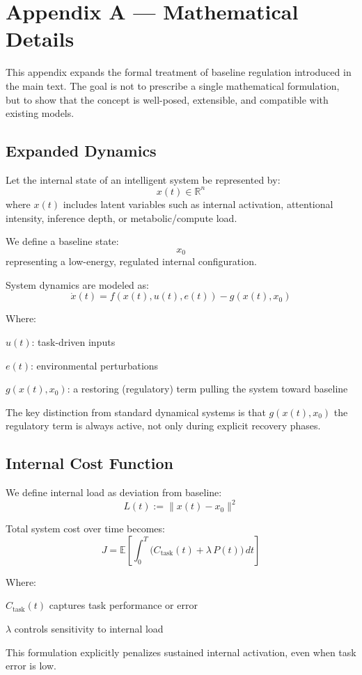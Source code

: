 \documentclass[11pt]{article}
\begin{document}
\appendix

\section{Appendix A — Mathematical Details}
This appendix expands the formal treatment of baseline regulation introduced in the main text. The goal is not to prescribe a single mathematical formulation, but to show that the concept is well-posed, extensible, and compatible with existing models.

\subsection{Expanded Dynamics}
Let the internal state of an intelligent system be represented by:
\[
x(t)\in\mathbb{R}^{n}
\]
where \(x(t)\) includes latent variables such as internal activation, attentional intensity, inference depth, or metabolic/compute load.

We define a baseline state:
\[
x_0
\]
representing a low-energy, regulated internal configuration.

System dynamics are modeled as:
\[
\dot{x}(t)=f(x(t),u(t),e(t)) - g(x(t),x_0)
\]

Where:

\(u(t)\): task-driven inputs

\(e(t)\): environmental perturbations

\(g(x(t),x_0)\): a restoring (regulatory) term pulling the system toward baseline

The key distinction from standard dynamical systems is that \(g(x(t),x_0)\) the regulatory term is always active, not only during explicit recovery phases.

\subsection{Internal Cost Function}
We define internal load as deviation from baseline:
\[
L(t):=\|x(t)-x_0\|^{2}
\]

Total system cost over time becomes:
\[
J=\mathbb{E}\!\left[\int_{0}^{T}\big(C_{\mathrm{task}}(t)+\lambda\,P(t)\big)\,dt\right]
\]

Where:

\(C_{\mathrm{task}}(t)\) captures task performance or error

\(\lambda\) controls sensitivity to internal load

This formulation explicitly penalizes sustained internal activation, even when task error is low.
\end{document}

